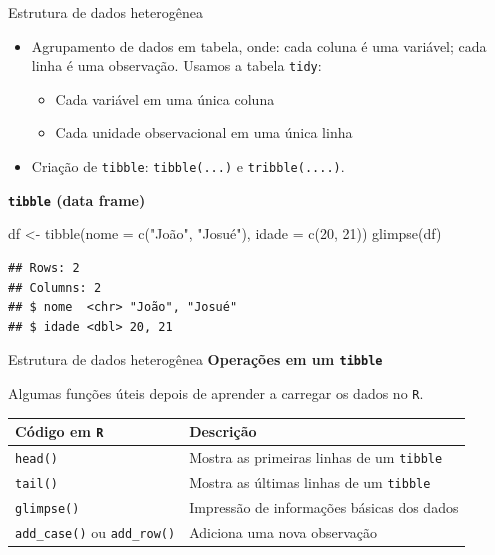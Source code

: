 \documentclass[
  10pt,
  ignorenonframetext,
]{beamer}
\newenvironment{Shaded}{}{}
\newcommand{\DataTypeTok}[1]{#1}
\newcommand{\DecValTok}[1]{#1}
\newcommand{\KeywordTok}[1]{\textcolor[rgb]{0.00,0.00,1.00}{#1}}
\newcommand{\NormalTok}[1]{#1}
\newcommand{\StringTok}[1]{\textcolor[rgb]{0.00,0.50,0.50}{#1}}
\providecommand{\tightlist}{%
  \setlength{\itemsep}{0pt}\setlength{\parskip}{0pt}}
\begin{document}
\begin{frame}[fragile]{Estrutura de dados heterogênea}
\protect\hypertarget{estrutura-de-dados-heteroguxeanea-1}{}
\begin{itemize}
\tightlist
\item
  Agrupamento de dados em tabela, onde: cada coluna é uma variável; cada
  linha é uma observação. Usamos a tabela \texttt{tidy}:

  \begin{itemize}
  \tightlist
  \item
    Cada variável em uma única coluna
  \item
    Cada unidade observacional em uma única linha
  \end{itemize}
\item
  Criação de \texttt{tibble}: \texttt{tibble(...)} e
  \texttt{tribble(....)}.
\end{itemize}

\textbf{\texttt{tibble} (data frame)}

\begin{Shaded}
\begin{Highlighting}[]
\NormalTok{df \textless{}{-}}\StringTok{ }\KeywordTok{tibble}\NormalTok{(}\DataTypeTok{nome =} \KeywordTok{c}\NormalTok{(}\StringTok{"João"}\NormalTok{, }\StringTok{"Josué"}\NormalTok{), }\DataTypeTok{idade =} \KeywordTok{c}\NormalTok{(}\DecValTok{20}\NormalTok{, }\DecValTok{21}\NormalTok{))}
\KeywordTok{glimpse}\NormalTok{(df)}
\end{Highlighting}
\end{Shaded}

\begin{verbatim}
## Rows: 2
## Columns: 2
## $ nome  <chr> "João", "Josué"
## $ idade <dbl> 20, 21
\end{verbatim}
\end{frame}

\begin{frame}[fragile]{Estrutura de dados heterogênea}
\protect\hypertarget{estrutura-de-dados-heteroguxeanea-2}{}
\textbf{Operações em um \texttt{tibble}}

Algumas funções úteis depois de aprender a carregar os dados no
\texttt{R}.

\begin{longtable}[]{@{}ll@{}}
\toprule
Código em \texttt{R} & Descrição\tabularnewline
\midrule
\endhead
\texttt{head()} & Mostra as primeiras linhas de um
\texttt{tibble}\tabularnewline
\texttt{tail()} & Mostra as últimas linhas de um
\texttt{tibble}\tabularnewline
\texttt{glimpse()} & Impressão de informações básicas dos
dados\tabularnewline
\texttt{add\_case()} ou \texttt{add\_row()} & Adiciona uma nova
observação\tabularnewline
\bottomrule
\end{longtable}
\end{frame}
\end{document}
